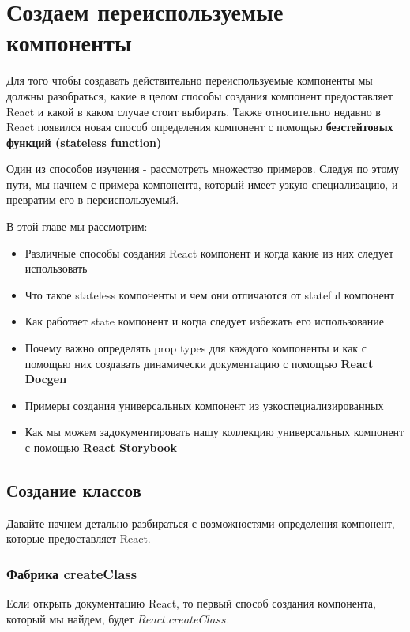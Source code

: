 \chapter{Создаем переиспользуемые компоненты}

Для того чтобы создавать действительно переиспользуемые компоненты мы должны разобраться, какие в целом способы создания компонент предоставляет React и какой в каком случае стоит выбирать. Также относительно недавно в React появился новая способ определения компонент с помощью \textbf{безстейтовых функций (stateless function)}

Один из способов изучения - рассмотреть множество примеров. Следуя по этому пути, мы начнем с примера компонента, который имеет узкую специализацию, и превратим его в переиспользуемый.

В этой главе мы рассмотрим:

\begin{itemize}
  \item Различные способы создания React компонент и когда какие из них следует использовать
  \item Что такое stateless компоненты и чем они отличаются от stateful компонент
  \item Как работает state компонент и когда следует избежать его использование
  \item Почему важно определять prop types для каждого компоненты и как с помощью них создавать динамически документацию с помощью \textbf{React Docgen}
  \item Примеры создания универсальных компонент из узкоспециализированных
  \item Как мы можем задокументировать нашу коллекцию универсальных компонент с помощью \textbf{React Storybook}
\end{itemize}


\section{Создание классов}

Давайте начнем детально разбираться с возможностями определения компонент, которые предоставляет React.

\subsection*{Фабрика createClass}

Если открыть документацию React, то первый способ создания компонента, который мы найдем, будет $React.createClass$.

